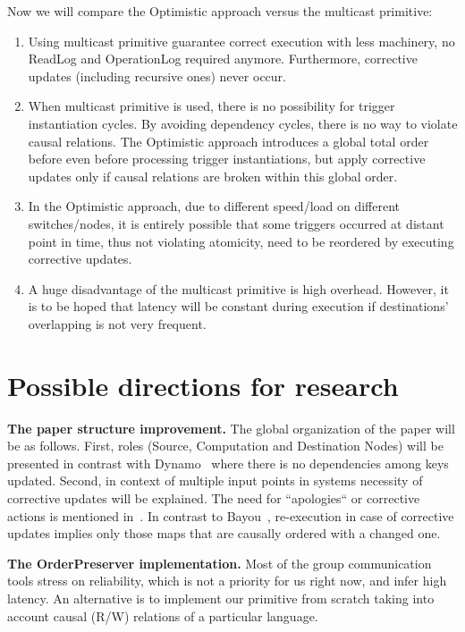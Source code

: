 \documentclass{sig-semester}
\begin{document}
Now we will compare the Optimistic approach versus the multicast primitive:
\begin{enumerate}[(1)]
 \item Using multicast primitive guarantee correct execution with less machinery, no ReadLog and OperationLog required anymore. Furthermore, corrective updates (including recursive ones) never occur.
 \item When multicast primitive is used, there is no possibility for trigger instantiation cycles. By avoiding dependency cycles, there is no way to violate causal relations. The Optimistic approach introduces a global total order before even before processing trigger instantiations, but apply corrective updates only if causal relations are broken within this global order.
 \item In the Optimistic approach, due to different speed/load on different switches/nodes, it is entirely possible that some triggers occurred at distant point in time, thus not violating atomicity, need to be reordered by executing corrective updates. 
 \item A huge disadvantage of the multicast primitive is high overhead. However, it is to be hoped that latency will be constant during execution if destinations' overlapping is not very frequent.
\end{enumerate}

\section{Possible directions for research}
\vspace{2mm}

\textbf{The paper structure improvement.} The global organization of the paper will be as follows. First, roles (Source, Computation and Destination Nodes) will be presented in contrast with Dynamo~\cite{decandia07} where there is no dependencies among keys updated. Second, in context of multiple input points in systems necessity of corrective updates will be explained. The need for ``apologies`` or corrective actions is mentioned in~\cite{alvaro11}. In contrast to Bayou~\cite{petersen97}, re-execution in case of corrective updates implies only those maps that are causally ordered with a changed one.

\textbf{The OrderPreserver implementation.}
Most of the group communication tools stress on reliability, which is not a priority for us right now, and infer high latency. An alternative is to implement our primitive from scratch taking into account causal (R/W) relations of a particular language.
 
{


}

\newpage
\end{document}
